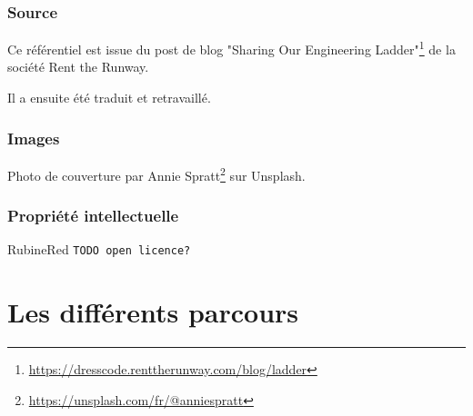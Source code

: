 \documentclass[a4paper, french, openany, 12pt]{book}
\newcommand{\fullwidthimage}[1]{
  \begin{center}
    \makebox[\textwidth]{\texttt{[image: \#1]}}
  \end{center}
}
\newcommand{\todo}[1]{
  \begin{color}{RubineRed}
    \texttt{TODO {#1}}
  \end{color}
}
\begin{document}
\begin{multicols}{2}
  \section*{Source}
  
  Ce référentiel est issue du post de blog 
  "Sharing Our Engineering Ladder"\footnote{\url{https://dresscode.renttherunway.com/blog/ladder}}
  de la société Rent the Runway.
  
  Il a ensuite été traduit et retravaillé.
  
  \section*{Images}
  
  Photo de couverture par Annie Spratt\footnote{\url{https://unsplash.com/fr/@anniespratt}} sur Unsplash.
  
  \section*{Propriété intellectuelle}
  
  \todo{open licence?}
  
\end{multicols}
  
\mainmatter

\part{Les différents parcours}

\fullwidthimage{images/tracks.png}
\end{document}
